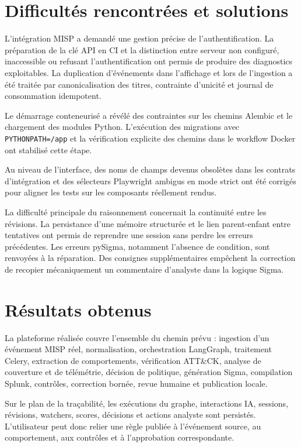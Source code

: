 \section{Difficultés rencontrées et solutions}

L'intégration MISP a demandé une gestion précise de l'authentification. La préparation de la clé API en CI et la distinction entre serveur non configuré, inaccessible ou refusant l'authentification ont permis de produire des diagnostics exploitables. La duplication d'événements dans l'affichage et lors de l'ingestion a été traitée par canonicalisation des titres, contrainte d'unicité et journal de consommation idempotent.

Le démarrage conteneurisé a révélé des contraintes sur les chemins Alembic et le chargement des modules Python. L'exécution des migrations avec \texttt{PYTHONPATH=/app} et la vérification explicite des chemins dans le workflow Docker ont stabilisé cette étape.

Au niveau de l'interface, des noms de champs devenus obsolètes dans les contrats d'intégration et des sélecteurs Playwright ambigus en mode strict ont été corrigés pour aligner les tests sur les composants réellement rendus.

La difficulté principale du raisonnement concernait la continuité entre les révisions. La persistance d'une mémoire structurée et le lien parent-enfant entre tentatives ont permis de reprendre une session sans perdre les erreurs précédentes. Les erreurs pySigma, notamment l'absence de condition, sont renvoyées à la réparation. Des consignes supplémentaires empêchent la correction de recopier mécaniquement un commentaire d'analyste dans la logique Sigma.

\section{Résultats obtenus}

La plateforme réalisée couvre l'ensemble du chemin prévu : ingestion d'un événement MISP réel, normalisation, orchestration LangGraph, traitement Celery, extraction de comportements, vérification ATT\&CK, analyse de couverture et de télémétrie, décision de politique, génération Sigma, compilation Splunk, contrôles, correction bornée, revue humaine et publication locale.

Sur le plan de la traçabilité, les exécutions du graphe, interactions IA, sessions, révisions, watchers, scores, décisions et actions analyste sont persistés. L'utilisateur peut donc relier une règle publiée à l'événement source, au comportement, aux contrôles et à l'approbation correspondante.

